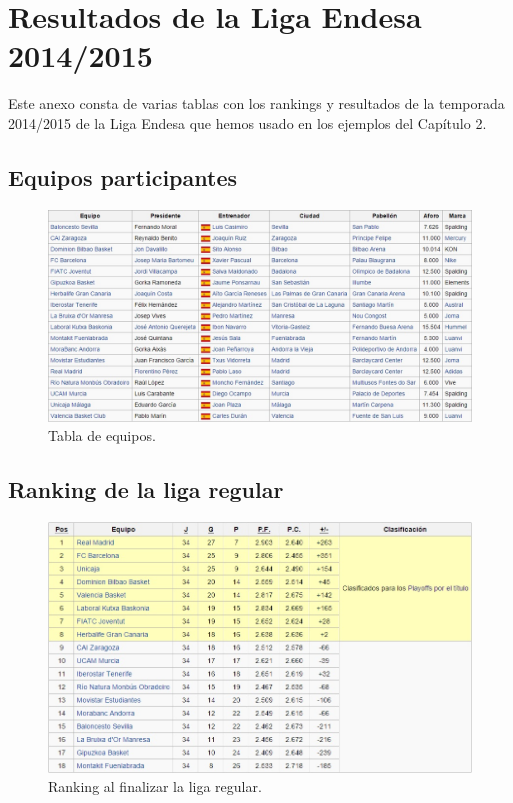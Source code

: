 \chapter{Resultados de la Liga Endesa 2014/2015}
Este anexo consta de varias tablas con los rankings y resultados de la temporada 2014/2015 de la Liga Endesa que hemos usado en los ejemplos del Capítulo 2.\\

\section*{Equipos participantes}

\begin{figure}[H]
	\centering
	\includegraphics[scale=0.6]{images/equipos.jpg}
	\caption{Tabla de equipos.} 
\end{figure}

\section*{Ranking de la liga regular}

\begin{figure}[H]
	\centering
	\includegraphics[scale=0.7]{images/regular.jpg}
	\caption{Ranking al finalizar la liga regular.} 
\end{figure}

